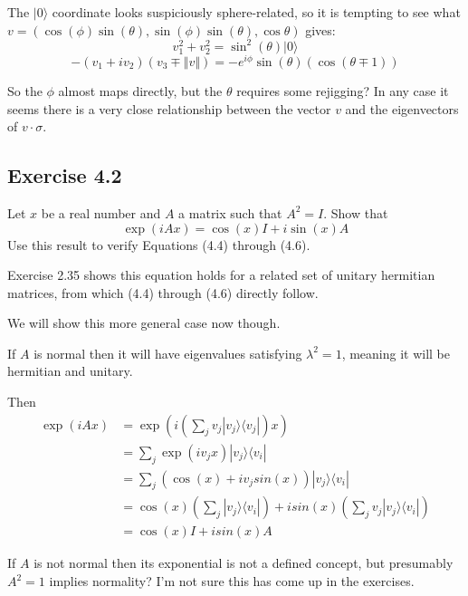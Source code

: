 \documentclass[]{article}
\newcommand{\bra}[1]{\langle #1 |}
\newcommand{\ket}[1]{| #1 \rangle}
\newcommand{\norm}[1]{\left\Vert #1 \right\Vert}
\begin{document}
The $\ket{0}$ coordinate looks suspiciously sphere-related, so it is tempting to see what $v = (\cos(\phi)\sin(\theta),\sin(\phi)\sin(\theta),\cos\theta)$ gives:
\[v_1^2+v_2^2=\sin^2(\theta)\ket{0}\]
\[-(v_1+iv_2)(v_3\mp\norm{v}) = -e^{i\phi}\sin(\theta)(\cos(\theta \mp 1))\]

So the $\phi$ almost maps directly, but the $\theta$ requires some rejigging? In any case it seems there is a very close relationship between the vector $v$ and the eigenvectors of $v \cdot \sigma$.

\subsection{Exercise 4.2}
Let $x$ be a real number and $A$ a matrix such that $A^2=I$. Show that 
\[\exp(iAx)=\cos(x)I+i\sin(x)A\]
Use this result to verify Equations (4.4) through (4.6).

Exercise 2.35 shows this equation holds for a related set of unitary hermitian matrices, from which (4.4) through (4.6) directly follow.

We will show this more general case now though.

If $A$ is normal then it will have eigenvalues satisfying $\lambda^2 = 1$, meaning it will be hermitian and unitary.

Then
\begin{align*}
\exp(iAx)
&= \exp\left(i\left(\sum_j v_j\ket{v_j}\bra{v_j}\right)x\right)
\\&= \sum_j \exp(iv_jx)\ket{v_j}\bra{v_i}
\\&= \sum_j (\cos(x)+iv_jsin(x))\ket{v_j}\bra{v_i}
\\&= \cos(x)\left(\sum_j \ket{v_j}\bra{v_i}\right)+isin(x)\left(\sum_j v_j\ket{v_j}\bra{v_i}\right)
\\&= \cos(x)I+isin(x)A
\end{align*}

If $A$ is not normal then its exponential is not a defined concept, but presumably $A^2=1$ implies normality? I'm not sure this has come up in the exercises.
\end{document}
